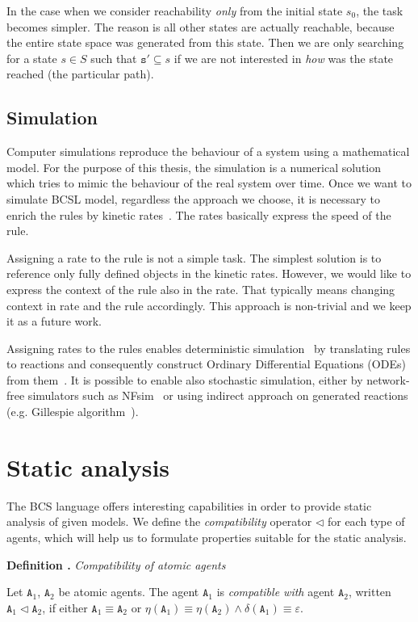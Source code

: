 \documentclass[12pt, twoside]{fithesis2} %
\newcounter{counter}[section]
\renewcommand{\thecounter}{\thesection.\arabic{counter}}
\newenvironment{definition}[1]{\bigskip\refstepcounter{counter}\noindent\textbf{Definition \thecounter } \emph{#1} \par\nopagebreak \begin{itshape}}{\end{itshape}\bigskip}
\begin{document}
In the case when we consider reachability \emph{only} from the initial state $s_0$, the task becomes simpler. The reason is all other states are actually reachable, because the entire state space was generated from this state. Then we are only searching for a state $s \in S$ such that $\mathtt{s}' \subseteq s$ if we are not interested in \emph{how} was the state reached (the particular path).

\subsection{Simulation}
\label{simulation}

Computer simulations reproduce the behaviour of a system using a mathematical model. For the purpose of this thesis, the simulation is a numerical solution which tries to mimic the behaviour of the real system over time. Once we want to simulate BCSL model, regardless the approach we choose, it is necessary to enrich the rules by kinetic rates~\cite{mcnaught1997compendium}. The rates basically express the speed of the rule.

Assigning a rate to the rule is not a simple task. The simplest solution is to reference only fully defined objects in the kinetic rates. However, we would like to express the context of the rule also in the rate. That typically means changing context in rate and the rule accordingly. This approach is non-trivial and we keep it as a future work.

Assigning rates to the rules enables deterministic simulation~\cite{Poole2000} by translating rules to reactions and consequently construct Ordinary Differential Equations (ODEs) from them~\cite{higham2008Modelling}. It is possible to enable also stochastic simulation, either by network-free simulators such as NFsim~\cite{sneddon2011efficient} or using indirect approach on generated reactions (e.g. Gillespie algorithm~\cite{GILLESPIE1976403}).

\section{Static analysis}
\label{static_analyses}

The BCS language offers interesting capabilities in order to provide static analysis of given models. We define the \emph{compatibility} operator $\lhd$ for each type of agents, which will help us to formulate properties suitable for the static analysis.

\begin{definition}{Compatibility of atomic agents}
Let $\mathtt{A}_1$, $\mathtt{A}_2$ be atomic agents. The agent $\mathtt{A}_1$ is \emph{compatible with} agent $\mathtt{A}_2$, written $\mathtt{A}_1 \lhd \mathtt{A}_2$, if either $\mathtt{A}_1 \equiv \mathtt{A}_2$ or $\eta(\mathtt{A}_1) \equiv \eta(\mathtt{A}_2) \wedge \delta(\mathtt{A}_1) \equiv \varepsilon $.
\end{definition}
\end{document}
